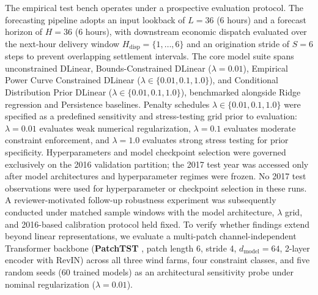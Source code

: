 The empirical test bench operates under a prospective evaluation protocol. The forecasting pipeline adopts an input lookback of $L=36$ (6 hours) and a forecast horizon of $H=36$ (6 hours), with downstream economic dispatch evaluated over the next-hour delivery window $H_{\text{disp}} = \{1, \dots, 6\}$ and an origination stride of $S=6$ steps to prevent overlapping settlement intervals. The core model suite spans unconstrained DLinear, Bounds-Constrained DLinear ($\lambda=0.01$), Empirical Power Curve Constrained DLinear ($\lambda \in \{0.01, 0.1, 1.0\}$), and Conditional Distribution Prior DLinear ($\lambda \in \{0.01, 0.1, 1.0\}$), benchmarked alongside Ridge regression and Persistence baselines. Penalty schedules $\lambda \in \{0.01, 0.1, 1.0\}$ were specified as a predefined sensitivity and stress-testing grid prior to evaluation: $\lambda=0.01$ evaluates weak numerical regularization, $\lambda=0.1$ evaluates moderate constraint enforcement, and $\lambda=1.0$ evaluates strong stress testing for prior specificity. Hyperparameters and model checkpoint selection were governed exclusively on the 2016 validation partition; the 2017 test year was accessed only after model architectures and hyperparameter regimes were frozen. No 2017 test observations were used for hyperparameter or checkpoint selection in these runs. A reviewer-motivated follow-up robustness experiment was subsequently conducted under matched sample windows with the model architecture, $\lambda$ grid, and 2016-based calibration protocol held fixed. To verify whether findings extend beyond linear representations, we evaluate a multi-patch channel-independent Transformer backbone (\textbf{PatchTST} \cite{nie2023patchtst}, patch length 6, stride 4, $d_{\text{model}}=64$, 2-layer encoder with RevIN) across all three wind farms, four constraint classes, and five random seeds (60 trained models) as an architectural sensitivity probe under nominal regularization ($\lambda=0.01$).


